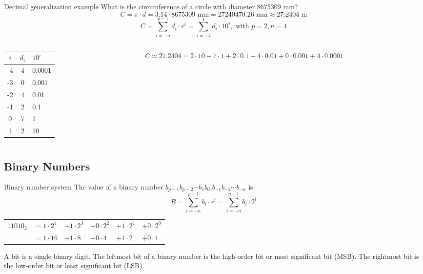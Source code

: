 \begin{frame}[t]{Decimal generalization example}
  What is the circumference of a circle with diameter $8675309$ mm?
  $$C = \pi \cdot d = 3.14 \cdot 8675309 \text{ mm} = 27240470.26 \text{ mm} \approx 27.2404 \text{ m}$$
  $$C = \sum_{i=-n}^{p-1}d_i \cdot r^i = \sum_{i=-4}^{1}d_i \cdot 10^i, \text{ with } p=2, n=4$$
  \begin{columns}
    \begin{column}{2cm}
      \begin{tabular}{c|cl}
        $i$ & $d_i$ & $10^i$ \\
        \hline
        -4 & 4 & 0.0001 \\
        -3 & 0 & 0.001 \\
        -2 & 4 & 0.01 \\
        -1 & 2 & 0.1 \\
        0 & 7 & 1 \\
        1 & 2 & 10 \\
      \end{tabular}
    \end{column}
    \begin{column}{7cm}
      $C \approx 27.2404 = 2 \cdot 10 + 7 \cdot 1 + 2 \cdot 0.1 + 4 \cdot 0.01 + 0 \cdot 0.001 + 4 \cdot 0.0001$
    \end{column}
  \end{columns}
\end{frame}

\subsection{Binary Numbers}

\begin{frame}{Binary number system}
  The value of a binary number $b_{p-1} b_{p-2} \cdots b_1 b_0 . b_{-1} b_{-2} \cdots b_{-n}$ is
  $$B=\sum_{i=-n}^{p-1}b_i \cdot r^i = \sum_{i=-n}^{p-1}b_i \cdot 2^i$$
  \begin{example}
    \begin{tabular}{llllll}
      $11010_2$ & $= 1 \cdot 2^4$ & $+ 1 \cdot 2^3$ & $+ 0 \cdot 2^2$ & $+ 1 \cdot 2^1$ & $+ 0 \cdot 2^0$\\
      & $= 1 \cdot 16$ & $+ 1 \cdot 8$ & $+ 0 \cdot 4$ & $+ 1 \cdot 2$ & $+ 0 \cdot 1$\\
    \end{tabular}
  \end{example}
  \begin{definition}
    A \alert{bit} is a single binary digit.  The leftmost bit of a binary number is the \alert{high-order bit} or \alert{most significant bit (MSB)}.  The rightmost bit is the \alert{low-order bit} or \alert{least significant bit (LSB)}.
  \end{definition}
\end{frame}

